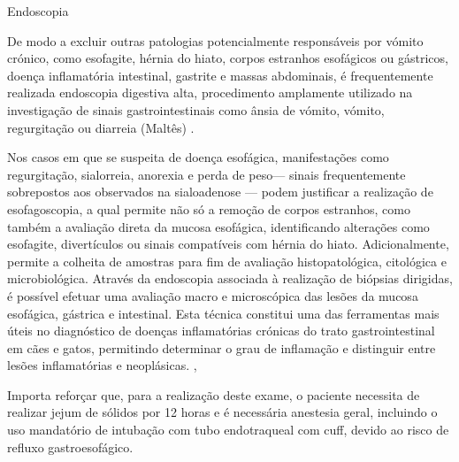 Endoscopia 


De modo a excluir outras patologias potencialmente responsáveis por vómito crónico, como esofagite, hérnia do hiato, corpos estranhos esofágicos ou gástricos, doença inflamatória intestinal, gastrite e massas abdominais, é frequentemente realizada endoscopia digestiva alta, procedimento amplamente utilizado na investigação de sinais gastrointestinais como ânsia de vómito, vómito, regurgitação ou diarreia (Maltês) \cite{mccarthy_veterinary_2021}.


Nos casos em que se suspeita de doença esofágica, manifestações como regurgitação, sialorreia, anorexia e perda de peso— sinais frequentemente sobrepostos aos observados na sialoadenose — podem justificar a realização de esofagoscopia, a qual permite não só a remoção de corpos estranhos, como também a avaliação direta da mucosa esofágica, identificando alterações como esofagite, divertículos ou sinais compatíveis com hérnia do hiato. \cite{Sum2009} Adicionalmente, permite a colheita de amostras para fim de avaliação histopatológica, citológica e microbiológica. \cite{Prasanna2019} Através da endoscopia associada à realização de biópsias dirigidas, é possível efetuar uma avaliação macro e microscópica das lesões da mucosa esofágica, gástrica e intestinal. \cite{Rychlik2020} Esta técnica constitui uma das ferramentas mais úteis no diagnóstico de doenças inflamatórias crónicas do trato gastrointestinal em cães e gatos, permitindo determinar o grau de inflamação e distinguir entre lesões inflamatórias e neoplásicas. \cite{Rychlik2020},\cite{Jergens2016}


Importa reforçar que, para a realização deste exame, o paciente necessita de realizar jejum de sólidos por 12 horas e é necessária anestesia geral, incluindo o uso mandatório de intubação com tubo endotraqueal com cuff, devido ao risco de refluxo gastroesofágico. \cite{lhermette_bsava_2021,mccarthy_veterinary_2021}


